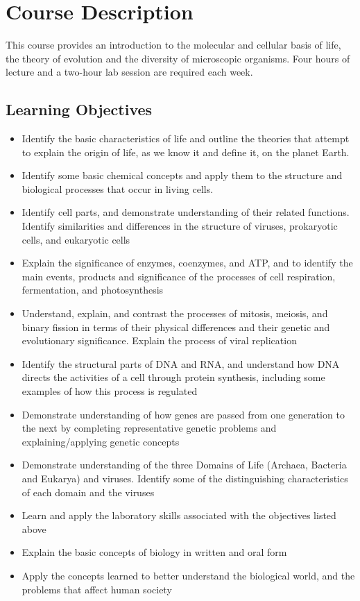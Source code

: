 \documentclass[]{book}
\begin{document}
\hypertarget{course-description}{%
\chapter{Course Description}\label{course-description}}

This course provides an introduction to the molecular and cellular basis of life, the theory of evolution and the diversity of microscopic organisms. Four hours of lecture and a two-hour lab session are required each week.

\hypertarget{learning-objectives}{%
\section{Learning Objectives}\label{learning-objectives}}

\begin{itemize}
\item
  Identify the basic characteristics of life and outline the theories that attempt to explain the origin of life, as we know it and define it, on the planet Earth.
\item
  Identify some basic chemical concepts and apply them to the structure and biological processes that occur in living cells.
\item
  Identify cell parts, and demonstrate understanding of their related functions. Identify similarities and differences in the structure of viruses, prokaryotic cells, and eukaryotic cells
\item
  Explain the significance of enzymes, coenzymes, and ATP, and to identify the main events, products and significance of the processes of cell respiration, fermentation, and photosynthesis
\item
  Understand, explain, and contrast the processes of mitosis, meiosis, and binary fission in terms of their physical differences and their genetic and evolutionary significance. Explain the process of viral replication
\item
  Identify the structural parts of DNA and RNA, and understand how DNA directs the activities of a cell through protein synthesis, including some examples of how this process is regulated
\item
  Demonstrate understanding of how genes are passed from one generation to the next by completing representative genetic problems and explaining/applying genetic concepts
\item
  Demonstrate understanding of the three Domains of Life (Archaea, Bacteria and Eukarya) and viruses. Identify some of the distinguishing characteristics of each domain and the viruses
\item
  Learn and apply the laboratory skills associated with the objectives listed above
\item
  Explain the basic concepts of biology in written and oral form
\item
  Apply the concepts learned to better understand the biological world, and the problems that affect human society
\end{itemize}
\end{document}

